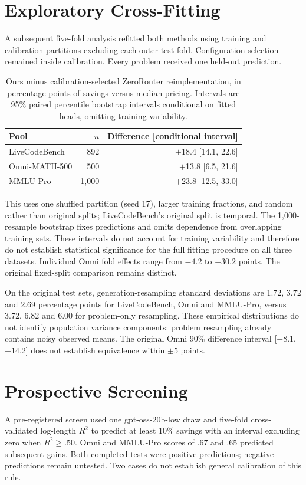 \documentclass[10pt,twocolumn,letterpaper]{article}
\begin{document}
\section{Exploratory Cross-Fitting}
A subsequent five-fold analysis refitted both methods using training and calibration partitions excluding each outer test fold. Configuration selection remained inside calibration. Every problem received one held-out prediction.
\begin{table}[t]
\centering
\footnotesize
\begin{tabular}{lrr}
\toprule
Pool & $n$ & Difference [conditional interval] \\
\midrule
LiveCodeBench & 892 & $+$18.4 [14.1, 22.6] \\
Omni-MATH-500 & 500 & $+$13.8 [6.5, 21.6] \\
MMLU-Pro & 1,000 & $+$23.8 [12.5, 33.0] \\
\bottomrule
\end{tabular}
\caption{Ours minus calibration-selected ZeroRouter reimplementation, in percentage points of savings versus median pricing. Intervals are 95\% paired percentile bootstrap intervals conditional on fitted heads, omitting training variability.}
\end{table}

This uses one shuffled partition (seed 17), larger training fractions, and random rather than original splits; LiveCodeBench's original split is temporal. The 1,000-resample bootstrap fixes predictions and omits dependence from overlapping training sets. These intervals do not account for training variability and therefore do not establish statistical significance for the full fitting procedure on all three datasets. Individual Omni fold effects range from $-4.2$ to $+30.2$ points. The original fixed-split comparison remains distinct.

On the original test sets, generation-resampling standard deviations are 1.72, 3.72 and 2.69 percentage points for LiveCodeBench, Omni and MMLU-Pro, versus 3.72, 6.82 and 6.00 for problem-only resampling. These empirical distributions do not identify population variance components: problem resampling already contains noisy observed means. The original Omni 90\% difference interval [$-8.1$, $+14.2$] does not establish equivalence within $\pm5$ points.

\section{Prospective Screening}
A pre-registered screen used one gpt-oss-20b-low draw and five-fold cross-validated log-length $R^2$ to predict at least 10\% savings with an interval excluding zero when $R^2\geq .50$. Omni and MMLU-Pro scores of .67 and .65 predicted subsequent gains. Both completed tests were positive predictions; negative predictions remain untested. Two cases do not establish general calibration of this rule.
\end{document}
